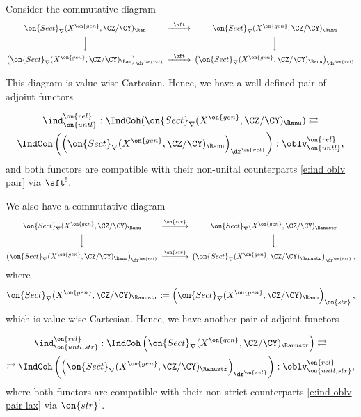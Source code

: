 \documentclass[9pt]{amsart}
\theoremstyle{remark}
\theoremstyle{definition}
\theoremstyle{remark}
\numberwithin{equation}{section}
\begin{document}
\sssec{}

Consider the commutative diagram
\begin{equation} \label{e:ind unital diagram}
\CD
\on{Sect}_\nabla(X^{\on{gen}},\CZ/\CY)_\Ran @>{\sft}>> \on{Sect}_\nabla(X^{\on{gen}},\CZ/\CY)_\Ranu \\ %
@VVV @VVV \\
\left(\on{Sect}_\nabla(X^{\on{gen}},\CZ/\CY)_\Ran\right)_{\dr^{\on{rel}}} @>{\sft}>> \left(\on{Sect}_\nabla(X^{\on{gen}},\CZ/\CY)_\Ranu\right)_{\dr^{\on{rel}}}
\endCD
\end{equation}

This diagram is value-wise Cartesian. Hence, we have a well-defined pair of adjoint functors

\begin{multline} \label{e:ind oblv pair lax}
\ind^{\on{rel}}_{\on{untl}}:\IndCoh(\on{Sect}_\nabla(X^{\on{gen}},\CZ/\CY)_\Ranu)\rightleftarrows \\
\IndCoh\left(\left(\on{Sect}_\nabla(X^{\on{gen}},\CZ/\CY)_\Ranu\right)_{\dr^{\on{rel}}}\right):\oblv^{\on{rel}}_{\on{untl}},
\end{multline} 
and both functors are compatible with their non-unital counterparts \eqref{e:ind oblv pair} via $\sft^!$.  

\sssec{}

We also have a commutative diagram
$$
\CD
\on{Sect}_\nabla(X^{\on{gen}},\CZ/\CY)_\Ranu @>{\on{str}}>> 
\on{Sect}_\nabla(X^{\on{gen}},\CZ/\CY)_{\Ranustr}\\
@VVV @VVV \\
\left(\on{Sect}_\nabla(X^{\on{gen}},\CZ/\CY)_\Ranu\right)_{\dr^{\on{rel}}}
@>{\on{str}}>>\left(\on{Sect}_\nabla(X^{\on{gen}},\CZ/\CY)_{\Ranustr}\right)_{\dr^{\on{rel}}},
\endCD
$$
where
$$\on{Sect}_\nabla(X^{\on{gen}},\CZ/\CY)_{\Ranustr}:=\left(\on{Sect}_\nabla(X^{\on{gen}},\CZ/\CY)_{\Ranu}\right)_{\on{str}},$$
which is value-wise Cartesian. Hence, we have another pair of adjoint functors

\medskip

\begin{multline} \label{e:ind oblv pair str}
\ind^{\on{rel}}_{\on{untl,str}}:\IndCoh\left(\on{Sect}_\nabla(X^{\on{gen}},\CZ/\CY)_\Ranustr\right) \rightleftarrows \\
\rightleftarrows \IndCoh\left(\left(\on{Sect}_\nabla(X^{\on{gen}},\CZ/\CY)_\Ranustr\right)_{\dr^{\on{rel}}}\right):\oblv^{\on{rel}}_{\on{untl,str}},
\end{multline} 
where both functors are compatible with their non-strict counterparts \eqref{e:ind oblv pair lax} via $\on{str}^!$.  
\end{document}
